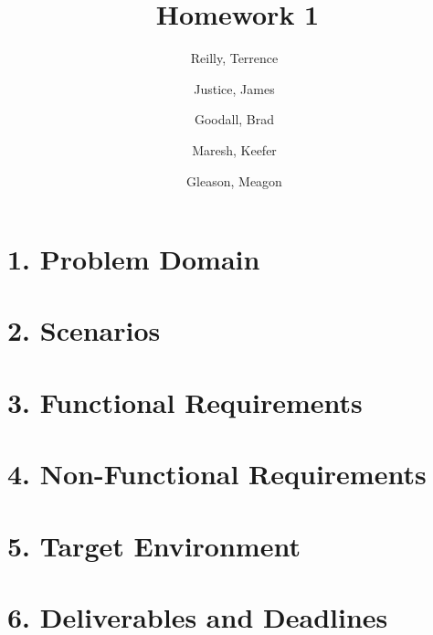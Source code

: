 \documentclass[a4paper,12pt]{article}
\author{
    Reilly, Terrence\
    \and
    Justice, James\
    \and
    Goodall, Brad\
    \and
    Maresh, Keefer\
    \and
    Gleason, Meagon\
}
\title{Homework 1}
\begin{document}
    \maketitle

    \section*{1. Problem Domain}
        

    \section*{2. Scenarios}
        

    \section*{3. Functional Requirements}
        

    \section*{4. Non-Functional Requirements}
        

    \section*{5. Target Environment}
        

    \section*{6. Deliverables and Deadlines}
        
\end{document}
